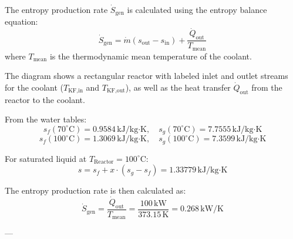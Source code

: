 The entropy production rate \( \dot{S}_{\text{gen}} \) is calculated using the entropy balance equation:  
\[
\dot{S}_{\text{gen}} = \dot{m} \left( s_{\text{out}} - s_{\text{in}} \right) + \frac{\dot{Q}_{\text{out}}}{T_{\text{mean}}}
\]  
where \( T_{\text{mean}} \) is the thermodynamic mean temperature of the coolant.  

The diagram shows a rectangular reactor with labeled inlet and outlet streams for the coolant (\( T_{\text{KF,in}} \) and \( T_{\text{KF,out}} \)), as well as the heat transfer \( \dot{Q}_{\text{out}} \) from the reactor to the coolant.  

From the water tables:  
\[
s_f(70^\circ\text{C}) = 0.9584 \, \text{kJ/kg·K}, \quad s_g(70^\circ\text{C}) = 7.7555 \, \text{kJ/kg·K}
\]  
\[
s_f(100^\circ\text{C}) = 1.3069 \, \text{kJ/kg·K}, \quad s_g(100^\circ\text{C}) = 7.3599 \, \text{kJ/kg·K}
\]  

For saturated liquid at \( T_{\text{Reactor}} = 100^\circ\text{C} \):  
\[
s = s_f + x \cdot (s_g - s_f) = 1.33779 \, \text{kJ/kg·K}
\]  

The entropy production rate is then calculated as:  
\[
\dot{S}_{\text{gen}} = \frac{\dot{Q}_{\text{out}}}{T_{\text{mean}}} = \frac{100 \, \text{kW}}{373.15 \, \text{K}} = 0.268 \, \text{kW/K}
\]  

---